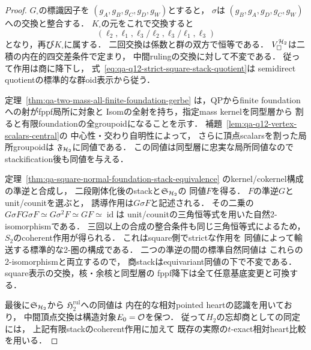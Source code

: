 \begin{proof}
$G_\square$の標識因子を
$(g_A,g_B,g_C,g_D,g_W)$とすると，
$\sigma$は
$(g_B,g_A,g_D,g_C,g_W)$への交換と整合する．
$K_\square$の元をこれで交換すると
\[
 (\ell_2,\ell_1,
 \ell_3/\ell_2,\ell_3/\ell_1,\ell_3)
\]
となり，再び$K_\square$に属する．
二回交換は係数と群の双方で恒等である．
$V_\square^{\mathcal H_2}$は二積の内在的四交差条件で定まり，
中間rulingの交換に対して不変である．
従って作用は商に降下し，
式~\eqref{eq:qa-q12-strict-square-stack-quotient}は
semidirect quotientの標準的な群oid表示から従う．

定理~\ref{thm:qa-two-mass-all-finite-foundation-gerbe}
は，QPからfinite foundationへの射がfppf局所に対象と
Isomの全射を持ち，指定mass kernelを同型層から
割ると有限foundationの全groupoidになることを示す．
補題~\ref{lem:qa-q12-vertex-scalars-central}の
中心性・交わり自明性によって，
さらに頂点scalarsを割った局所groupoidは
$\mathfrak F_{\mathcal H_2}$に同値である．
この同値は同型層に忠実な局所同値なので
stackification後も同値を与える．

定理~\ref{thm:qa-square-normal-foundation-stack-equivalence}
のkernel/cokernel構成の準逆と合成し，
二段剛体化後のstackと$\mathfrak S_{\mathcal H_2}$の
同値$F$を得る．
$F$の準逆$G$とunit/counitを選ぶと，
誘導作用は$G\sigma F$と記述される．
その二乗の$G\sigma FG\sigma F\simeq
G\sigma^2F\simeq GF\simeq\operatorname{id}$は
unit/counitの三角恒等式を用いた自然2-isomorphismである．
三回以上の合成の整合条件も同じ三角恒等式によるため，
$S_2$のcoherent作用が得られる．
これはsquare側でstrictな作用を
同値によって輸送する標準的な2-圏の構成である．
二つの準逆の間の標準自然同値は
これらの2-isomorphismと両立するので，
商stackはequivariant同値の下で不変である．
square表示の交換，核・余核と同型層の
fppf降下は全て任意基底変更と可換する．

最後に$\mathfrak S_{\mathcal H_2}$から
$\mathfrak H_2^{\mathrm{rul}}$への同値は
内在的な相対pointed heartの認識を用いており，
中間頂点交換は構造対象$E_0=\mathcal O$を保つ．
従って$H_2$の忘却商としての同定には，
上記有限stackのcoherent作用に加えて
既存の実際の$t$-exact相対heart比較を用いる．
\end{proof}

